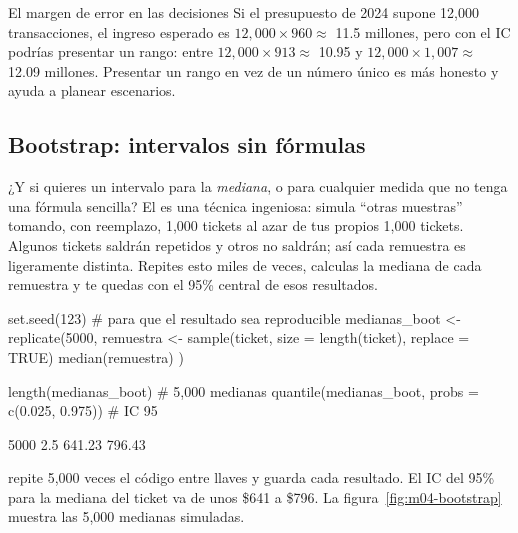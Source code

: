 \begin{negocio}{El margen de error en las decisiones}
Si el presupuesto de 2024 supone 12,000 transacciones, el ingreso esperado
es $12{,}000 \times 960 \approx$ 11.5 millones, pero con el IC podrías
presentar un rango: entre $12{,}000 \times 913 \approx$ 10.95 y
$12{,}000 \times 1{,}007 \approx$ 12.09 millones. Presentar un rango en
vez de un número único es más honesto y ayuda a planear escenarios.
\end{negocio}

\subsection{Bootstrap: intervalos sin fórmulas}

¿Y si quieres un intervalo para la \emph{mediana}, o para cualquier medida
que no tenga una fórmula sencilla? El  es una técnica
ingeniosa: simula ``otras muestras'' tomando, con reemplazo, 1,000 tickets al
azar de tus propios 1,000 tickets. Algunos tickets saldrán repetidos y otros
no saldrán; así cada remuestra es ligeramente distinta. Repites esto miles de
veces, calculas la mediana de cada remuestra y te quedas con el 95\% central
de esos resultados.

\begin{rcode}
set.seed(123)   # para que el resultado sea reproducible
medianas_boot <- replicate(5000, {
  remuestra <- sample(ticket, size = length(ticket), replace = TRUE)
  median(remuestra)
})

length(medianas_boot)                           # 5,000 medianas
quantile(medianas_boot, probs = c(0.025, 0.975))   # IC 95%
\end{rcode}
\begin{rsalida}
[1] 5000
  2.5%
641.23 796.43
\end{rsalida}

 repite 5,000 veces el código entre llaves
y guarda cada resultado. El IC del 95\% para la mediana del ticket va de unos
\$641 a \$796. La figura~\ref{fig:m04-bootstrap} muestra las 5,000 medianas
simuladas.


